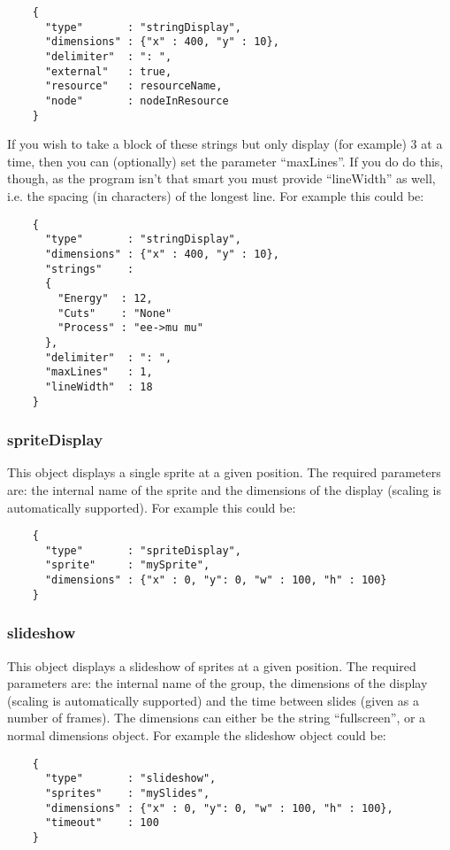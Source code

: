 \documentclass[a4paper]{article}
\begin{document}
  \begin{verbatim}
    {
      "type"       : "stringDisplay",
      "dimensions" : {"x" : 400, "y" : 10},
      "delimiter"  : ": ",
      "external"   : true,
      "resource"   : resourceName,
      "node"       : nodeInResource
    }
  \end{verbatim}

  If you wish to take a block of these strings but only display (for
  example) 3 at a time, then you can (optionally) set the parameter
  ``maxLines''. If you do do this, though, as the program isn't that smart 
  you must provide ``lineWidth'' as well, i.e. the spacing (in characters) 
  of the longest line. For example this could be:

  \begin{verbatim}
    {
      "type"       : "stringDisplay",
      "dimensions" : {"x" : 400, "y" : 10},
      "strings"    :
      {
        "Energy"  : 12,
        "Cuts"    : "None"
        "Process" : "ee->mu mu"
      },
      "delimiter"  : ": ",
      "maxLines"   : 1,
      "lineWidth"  : 18
    }
  \end{verbatim}


  \subsubsection{spriteDisplay}
  This object displays a single sprite at a given position. The required
  parameters are: the internal name of the sprite and the dimensions of the
  display (scaling is automatically supported). For example this could be:

  \begin{verbatim}
    {
      "type"       : "spriteDisplay",
      "sprite"     : "mySprite",
      "dimensions" : {"x" : 0, "y": 0, "w" : 100, "h" : 100}
    }
  \end{verbatim}

  \subsubsection{slideshow}
  This object displays a slideshow of sprites at a given position. The 
  required parameters are: the internal name of the group, the dimensions
  of the display (scaling is automatically supported) and the time between
  slides (given as a number of frames). The dimensions can either be the
  string ``fullscreen'', or a normal dimensions object. For example the
  slideshow object could be:

  \begin{verbatim}
    {
      "type"       : "slideshow",
      "sprites"    : "mySlides",
      "dimensions" : {"x" : 0, "y": 0, "w" : 100, "h" : 100},
      "timeout"    : 100
    }
  \end{verbatim}
\end{document}
